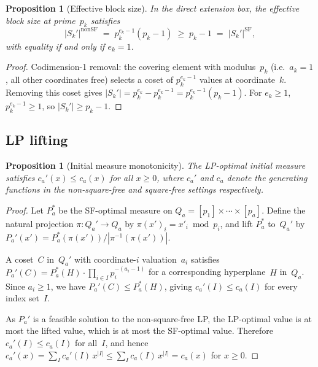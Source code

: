 \documentclass[11pt]{amsart}
\newtheorem{proposition}[theorem]{Proposition}
\theoremstyle{definition}
\theoremstyle{remark}
\begin{document}
\begin{proposition}[Effective block size]\label{prop:blocksize}
In the direct extension box, the effective block size at prime~$p_k$ satisfies
\[
  |S_k'|^{\mathrm{nonSF}}
  \;=\; p_k^{e_k - 1}(p_k - 1)
  \;\ge\; p_k - 1
  \;=\; |S_k'|^{\mathrm{SF}},
\]
with equality if and only if $e_k = 1$.
\end{proposition}

\begin{proof}
Codimension-1 removal: the covering element with modulus~$p_k$
(i.e.\ $a_k = 1$, all other coordinates free) selects a coset of
$p_k^{e_k - 1}$ values at coordinate~$k$.
Removing this coset gives $|S_k'| = p_k^{e_k} - p_k^{e_k - 1}
= p_k^{e_k - 1}(p_k - 1)$.
For $e_k \ge 1$, $p_k^{e_k - 1} \ge 1$, so $|S_k'| \ge p_k - 1$.
\end{proof}

\subsection{LP lifting}\label{subsec:lifting}

\begin{proposition}[Initial measure monotonicity]\label{prop:lifting}
The LP-optimal initial measure satisfies
$c_a'(x) \le c_a(x)$ for all $x \ge 0$, where $c_a'$ and $c_a$
denote the generating functions in the non-square-free and
square-free settings respectively.
\end{proposition}

\begin{proof}
Let $P_a^*$ be the SF-optimal measure on $Q_a = [p_1] \times \cdots \times [p_a]$.
Define the natural projection $\pi : Q_a' \to Q_a$ by
$\pi(x')_i = x'_i \bmod p_i$, and lift $P_a^*$ to~$Q_a'$ by
$P_a'(x') = P_a^*(\pi(x')) / |\pi^{-1}(\pi(x'))|$.

A coset~$C$ in~$Q_a'$ with coordinate-$i$ valuation~$a_i$ satisfies
$P_a'(C) = P_a^*(H) \cdot \prod_{i \in I} p_i^{-(a_i - 1)}$
for a corresponding hyperplane~$H$ in~$Q_a$.
Since $a_i \ge 1$, we have $P_a'(C) \le P_a^*(H)$, giving
$c_a'(I) \le c_a(I)$ for every index set~$I$.

As $P_a'$ is a feasible solution to the non-square-free LP, the
LP-optimal value is at most the lifted value, which is at most
the SF-optimal value.
Therefore $c_a'(I) \le c_a(I)$ for all~$I$, and hence
$c_a'(x) = \sum_I c_a'(I)\,x^{|I|} \le \sum_I c_a(I)\,x^{|I|} = c_a(x)$
for $x \ge 0$.
\end{proof}
\end{document}
